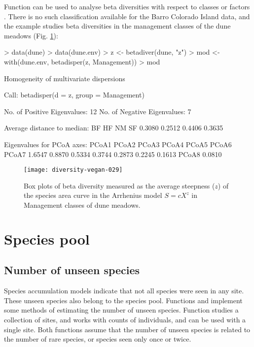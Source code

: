 \documentclass[a4paper,10pt,twocolumn]{article}
\begin{document}
Function  can be used to analyse beta diversities
with respect to classes or factors \citep{Anderson06, AndersonEtal06}.
There is no such classification available for the Barro Colorado
Island data, and the example studies beta diversities in the
management classes of the dune meadows (Fig. \ref{fig:betadisper}):
\begin{Schunk}
\begin{Sinput}
> data(dune)
> data(dune.env)
> z <- betadiver(dune, "z")
> mod <- with(dune.env, betadisper(z, Management))
> mod
\end{Sinput}
\begin{Soutput}
	Homogeneity of multivariate dispersions

Call: betadisper(d = z, group = Management)

No. of Positive Eigenvalues: 12
No. of Negative Eigenvalues: 7

Average distance to median:
    BF     HF     NM     SF 
0.3080 0.2512 0.4406 0.3635 

Eigenvalues for PCoA axes:
 PCoA1  PCoA2  PCoA3  PCoA4  PCoA5  PCoA6  PCoA7 
1.6547 0.8870 0.5334 0.3744 0.2873 0.2245 0.1613 
 PCoA8 
0.0810 
\end{Soutput}
\end{Schunk}
\begin{figure}
\texttt{[image: diversity-vegan-029]}
\caption{Box plots of beta diversity measured as the average steepness
  ($z$) of the species area curve in the Arrhenius model $S = cX^z$ in
  Management classes of dune meadows.}
\label{fig:betadisper}
\end{figure}

\section{Species pool}
\subsection{Number of unseen species}

Species accumulation models indicate that not all species were seen in
any site.  These unseen species also belong to the species pool.
Functions  and  implement some
methods of estimating the number of unseen species.  Function
 studies a collection of sites, and
 works with counts of individuals, and can be used
with a single site.  Both functions assume that the number of unseen
species is related to the number of rare species, or species seen only
once or twice.
\end{document}
